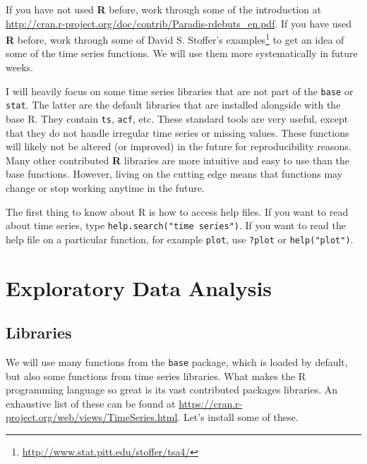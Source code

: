 \documentclass[]{book}
\let\rmarkdownfootnote\footnote%
\def\footnote{\protect\rmarkdownfootnote}
\renewcommand{\href}[2]{#2\footnote{\url{#1}}}
\begin{document}
If you have not used \textbf{R} before, work through some of the introduction at
\url{http://cran.r-project.org/doc/contrib/Paradis-rdebuts_en.pdf}.
If you have used \textbf{R} before, work through some of \href{http://www.stat.pitt.edu/stoffer/tsa4/}{David S. Stoffer's examples}
to get an idea of some of the time series functions. We will use them more systematically in future weeks.

I will heavily focus on some time series libraries that are not part of the \texttt{base} or \texttt{stat}. The latter are the default libraries that are installed alongside with the base R. They contain \texttt{ts}, \texttt{acf}, etc. These standard tools are very useful, except that they do not handle irregular time series or missing values. These functions will likely not be altered (or improved) in the future for reproducibility reasons. Many other contributed \textbf{R} libraries are more intuitive and easy to use than the base functions. However, living on the cutting edge means that functions may change or stop working anytime in the future.

The first thing to know about R is how to access help files. If you want to read about time series, type \texttt{help.search("time\ series")}. If you want to read the help file on a particular function, for example \texttt{plot}, use \texttt{?plot} or \texttt{help("plot")}.

\hypertarget{exploratory-data-analysis}{%
\section{Exploratory Data Analysis}\label{exploratory-data-analysis}}

\hypertarget{libraries}{%
\subsection{Libraries}\label{libraries}}

We will use many functions from the \texttt{base} package, which is loaded by default, but also some functions from time series libraries. What makes the R programming language so great is its vast contributed packages libraries. An exhaustive list of these can be found at \url{https://cran.r-project.org/web/views/TimeSeries.html}. Let's install some of these.
\end{document}
